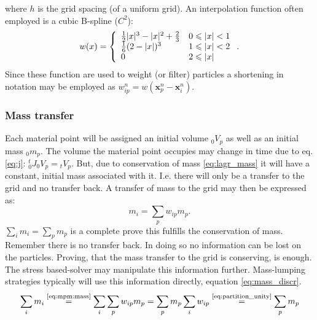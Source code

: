 \documentclass[m,times]{cgMA}
\begin{document}
where $h$ is the grid spacing (of a uniform grid). An interpolation function often employed is a cubic B-spline ($C^2$):
\begin{equation}\label{eq:cubic_weights}
  w(x) = \left\{ \begin{array} { l l } { \frac { 1 } { 2 } | x | ^ { 3 } - | x | ^ { 2 } + \frac { 2 } { 3 } } & { 0 \leqslant | x | < 1 } \\ { \frac { 1 } { 6 } ( 2 - | x | ) ^ { 3 } } & { 1 \leqslant | x | < 2 } \\ { 0 } & { 2 \leqslant | x | } \end{array} \right. .
\end{equation}
Since these function are used to weight (or filter) particles a shortening in notation may be employed as $ w_{ip}^n = w(\boldsymbol{x}_p^n-\boldsymbol{x}_i^n)$.
\cite{MPM:APIC}\cite{MPM:COURSE}\cite{steffen2008analysis}\cite{gao2017adaptive}
\subsubsection{Mass transfer}\label{sec:mass}
Each material point will be assigned an initial volume $_0V_p$ as well as an initial mass $_0m_p$. The volume the material point occupies may change in time due to eq. \ref{eq:j}: ${^t_0}J _0V_p = {_tV_p}$. But, due to conservation of mass \ref{eq:lagr_mass} it will have a constant, initial mass associated with it. I.e. there will only be a transfer to the grid and no transfer back.
A transfer of mass to the grid may then be expressed as:
\begin{equation}\label{eq:mpm:mass}
  m_i = \sum_p w_{ip}m_p.
\end{equation}
$\sum_i m_i =\sum_p m_p$ is a complete prove this fulfills the conservation of mass. Remember there is no transfer back. In doing so no information can be lost on the particles. Proving, that the mass transfer to the grid is conserving, is enough. The stress based-solver may manipulate this information further. Mass-lumping strategies typically will use this information directly, equation \ref{eq:mass_discr}.
\begin{equation}
  \sum_i m_i
  \stackrel{\text{\ref{eq:mpm:mass}}}{=}
  \sum _i \sum_p w_{ip} m_p =
  \sum _p m_p \sum_i w_{ip}
  \stackrel{\text{\ref{eq:partition_unity}}}{=}
  \sum_p m_p
\end{equation}
\begin{flushright}\cite{MPM:APIC}\cite{MPM:COURSE}\end{flushright}
\end{document}
